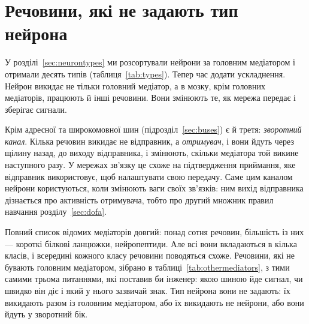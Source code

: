 \chapter{Речовини, які не задають тип нейрона}
\label{sec:othermediators}

У розділі~\ref{sec:neurontypes} ми розсортували нейрони за головним медіатором і отримали десять типів (таблиця~\ref{tab:types}). Тепер час додати ускладнення. Нейрон викидає не тільки головний медіатор, а в мозку, крім головних медіаторів, працюють й інші речовини. Вони змінюють те, як мережа передає і зберігає сигнали.

Крім адресної та широкомовної шин (підрозділ~\ref{sec:buses}) є й третя: \emph{зворотний канал}. Кілька речовин викидає не відправник, а \emph{отримувач}, і вони йдуть через щілину назад, до виходу відправника, і змінюють, скільки медіатора той викине наступного разу. У мережах зв'язку це схоже на підтвердження приймання, яке відправник використовує, щоб налаштувати свою передачу. Саме цим каналом нейрони користуються, коли змінюють ваги своїх зв'язків: ним вихід відправника дізнається про активність отримувача, тобто про другий множник правил навчання розділу~\ref{sec:dofa}.

Повний список відомих медіаторів довгий: понад сотня речовин, більшість із них --- короткі білкові ланцюжки, нейропептиди. Але всі вони вкладаються в кілька класів, і всередині кожного класу речовини поводяться схоже. Речовини, які не бувають головним медіатором, зібрано в таблиці~\ref{tab:othermediators}, з тими самими трьома питаннями, які поставив би інженер: якою шиною йде сигнал, чи швидко він діє і який у нього зазвичай знак. Тип нейрона вони не задають: їх викидають разом із головним медіатором, або їх викидають не нейрони, або вони йдуть у зворотний бік.

